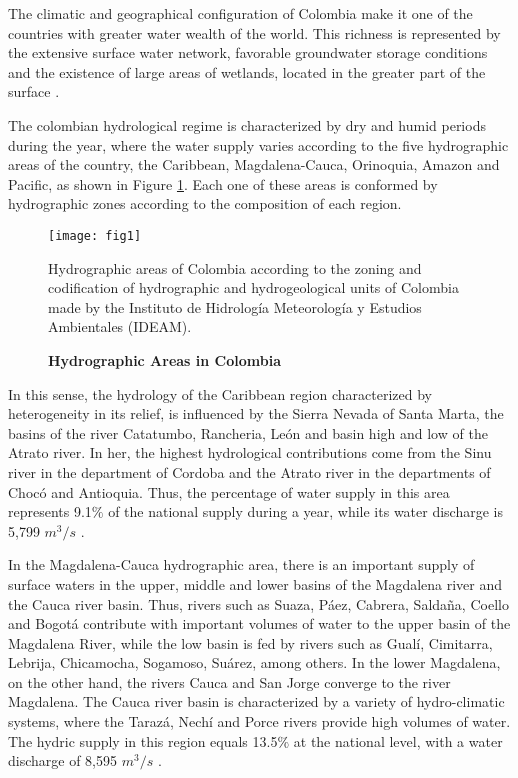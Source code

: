 \documentclass[12pt,halfline,a4paper]{ouparticle}
\begin{document}
The climatic and geographical configuration of Colombia make it one of the countries with greater water wealth of the world. This richness is represented by the extensive surface water network, favorable groundwater storage conditions and the existence of large areas of wetlands, located in the greater part of the surface \citep{Cabrera2010}.

The colombian hydrological regime is characterized by dry and humid periods during the year, where the water supply varies according to the five hydrographic areas of the country, the Caribbean, Magdalena-Cauca, Orinoquia, Amazon and Pacific, as shown in Figure \ref{fig:1}. Each one of these areas is conformed by hydrographic zones according to the composition of each region.

\begin{figure}[h]
	\centering
	\texttt{[image: fig1]}
	\caption{\textbf{Hydrographic Areas in Colombia}}
	\medskip
	\begin{minipage}{0.8\textwidth} 
		{\footnotesize{Hydrographic areas of Colombia according to the zoning and codification of hydrographic and hydrogeological units of Colombia made by the Instituto de Hidrología Meteorología y Estudios Ambientales (IDEAM).\par}}
	\end{minipage}
	\label{fig:1}
\end{figure}

In this sense, the hydrology of the Caribbean region characterized by heterogeneity in its relief, is influenced by the Sierra Nevada of Santa Marta, the basins of the river Catatumbo, Rancheria, León and basin high and low of the Atrato river. In her, the highest hydrological contributions come from the Sinu river in the department of Cordoba and the Atrato river in the departments of Chocó and Antioquia. Thus, the percentage of water supply in this area represents 9.1$\%$ of the national supply during a year, while its water discharge is 5,799 $m^{3}/s$ \citep{Santos2014}.

In the Magdalena-Cauca hydrographic area, there is an important supply of surface waters in the upper, middle and lower basins of the Magdalena river and the Cauca river basin. Thus, rivers such as Suaza, Páez, Cabrera, Saldaña, Coello and Bogotá contribute with important volumes of water to the upper basin of the Magdalena River, while the low basin is fed by rivers such as Gualí, Cimitarra, Lebrija, Chicamocha, Sogamoso, Suárez, among others. In the lower Magdalena, on the other hand, the rivers Cauca and San Jorge converge to the river Magdalena. The Cauca river basin is characterized by a variety of hydro-climatic systems, where the Tarazá, Nechí and Porce rivers provide high volumes of water. The hydric supply in this region equals 13.5$\%$ at the national level, with a water discharge of 8,595 $m^{3}/s$ \citep{Santos2014}.
\end{document}

